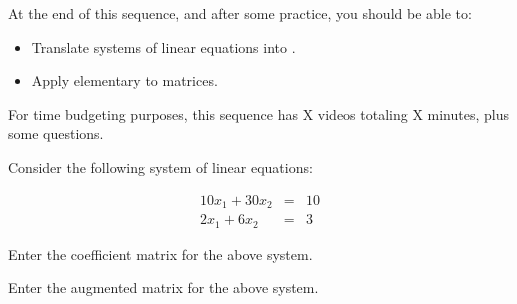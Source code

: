 







At the end of this sequence, and after some practice, you should be able to:

\begin{itemize}
\item Translate systems of linear equations into {}.
\item Apply elementary {} to matrices.  
\end{itemize}



For time budgeting purposes, this sequence has X videos totaling X minutes, 
plus some questions.  




\endedxtext

\endedxvertical








Consider the following system of linear equations:

\begin{eqnarray*}
10x_1 + 30x_2 & = & 10 \\
2x_1 + 6x_2 & = & 3 
\end{eqnarray*}



Enter the coefficient matrix for the above system.  







Enter the augmented matrix for the above system. 






